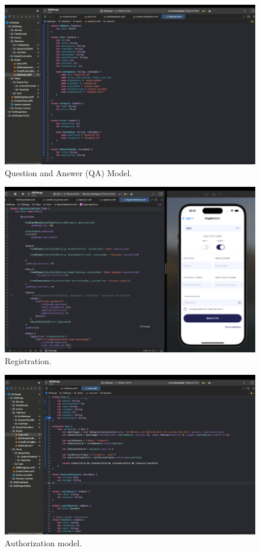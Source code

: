 \begin{figure}[H]\label{fig:questionanswerModel}
  \centering
  \includegraphics[width=0.8\linewidth]{figures/Question and Answer (QA) Model.png}
  \caption{Question and Answer (QA) Model.}
\end{figure}
\begin{figure}[H]\label{fig:registration}
  \centering
  \includegraphics[width=0.8\linewidth]{figures/Registration.png}
  \caption{Registration.}
\end{figure}
\begin{figure}[H]\label{fig:authorizationmodel}
  \centering
  \includegraphics[width=0.8\linewidth]{figures/Authorization model.png}
  \caption{Authorization model.}
\end{figure}
